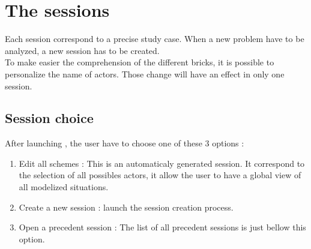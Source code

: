 \chapter{The sessions}

Each session correspond to a precise study case. When a new problem have to be analyzed, a new session has to be created.\\

To make easier the comprehension of the different bricks, it is possible to personalize the name of actors. Those change will have an effect in only one session. 

\section{Session choice}
After launching \tria, the user have to choose one of these 3 options :\\
\begin{enumerate}
\item Edit all schemes : This is an automaticaly generated session. It correspond to the selection of all possibles actors, it allow the user to have a global view of all modelized situations.\\
\item Create a new session : launch the session creation process.\\
\item Open a precedent session : The list of all precedent sessions is just bellow this option.\\
\end{enumerate}

